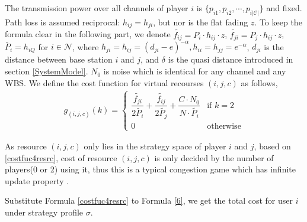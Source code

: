 The transmission power over all channels of player $i$ is $\{p_{i1}, p_{i2},\cdots, p_{i|\mathcal{C}|}\}$ and fixed. Path loss is assumed reciprocal: $h_{ij}=h_{ji}$, but nor is the flat fading $z$. To keep the formula clear in the following part, we denote $\tilde{f_{ij}}= P_i\cdot h_{ij}\cdot z$, $\tilde{f_{ji}}= P_j\cdot h_{ij}\cdot z$, $\tilde{P_i}=h_{iQ}$ for $i\in \mathcal{N}$, where $h_{ji}=h_{ij}=(d_{ji}-e)^{-\alpha}, h_{ii}=h_{jj}=e^{-\alpha}$, $d_{ji}$ is the distance between base station $i$ and $j$, and $\delta$ is the quasi distance introduced in section \ref{SystemModel}. $N_0$ is noise which is identical for any channel and any WBS. We define the cost function for virtual recourses $(i,j,c)$ as follows,
\begin{equation}
\label{costfuc4resrc}
\begin{split}
g_{(i,j,c)}(k) = 
\left\{ \begin{array}{ll}
\dfrac{\tilde{f_{ji}}}{2\tilde{P_i}} + \dfrac{\tilde{f_{ij}}}{2\tilde{P_j}} + \dfrac{C\cdot N_0}{N\cdot \tilde{P_i}} & \mbox{if $k=2$} \\
0 & \mbox{otherwise}
\end{array}
\right.
\end{split}
\end{equation}


As resource $(i,j,c)$ only lies in the strategy space of player $i$ and $j$, based on \ref{costfuc4resrc}, cost of resource $(i,j,c)$ is only decided by the number of players(0 or 2) using it, thus this is a typical congestion game which has infinite update property \cite{Voecking06congestiongames}.

Substitute Formula \ref{costfuc4resrc} to Formula \ref{6}, we get the total cost for user $i$ under strategy profile $\sigma$. 

